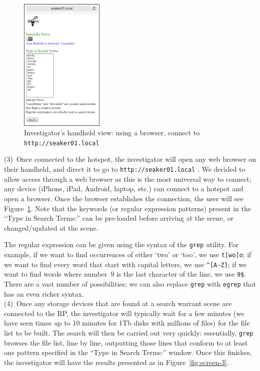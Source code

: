 \documentclass[12pt]{article}
\begin{document}
\begin{figure}[ht]
\begin{center}
\includegraphics[width=4cm]{images/seaker-hh-screen-2.jpg}
\caption{Investigator's handheld view: using a browser,
connect to {\tt http://seaker01.local}}\label{fig:screen-2}
\end{center}
\end{figure}

(3)~Once connected to the hotspot, the investigator will open any
web browser on their handheld, and direct it to go to
\verb|http://seaker01.local| . We decided to allow access
through a web browser as this is the most universal way to connect;
any device (iPhone, iPad, Android, laptop, etc.) can connect to a
hotspot and open a browser.  Once the browser establishes the
connection, the user will see Figure~\ref{fig:screen-2}. Note that the
keywords (or regular expression patterns) present in the ``Type in
Search Terms:'' can be pre-loaded before arriving at the scene, or
changed/updated at the scene.

The regular expression can be given using the syntax of the
\verb|grep| utility. For example, if we want to find occurrences of
either `two' or `too', we use \verb|t[wo]o|; if we want to find every
word that start with capital letters, we use \verb|^[A-Z]|; if we want
to find words where number~9 is the last character of the line, we use
\verb|9$|. There are a vast number of possibilities; we can also
replace \verb|grep| with \verb|egrep| that has an even richer syntax.\\

(4)~Once any storage devices that are found at a search warrant scene
are connected to the RP, the investigator will typically wait for a
few minutes (we have seen times up to 10 minutes for 1Tb disks with
millions of files) for the file list to be built. The search will then
be carried out very quickly: essentially, \verb|grep| browses the file
list, line by line, outputting those lines that conform to at least
one pattern specified in the ``Type in Search Terms:'' window. Once
this finishes, the investigator will have the results presented as in
Figure~\ref{fig:screen-3}.
\end{document}
